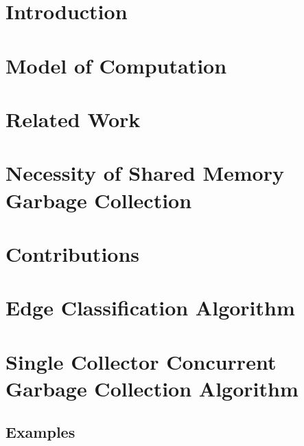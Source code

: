\section{Introduction}
\section{Model of Computation}
\section{Related Work}
\section{Necessity of Shared Memory Garbage Collection}
\section{Contributions}

\section{Edge Classification Algorithm}
\section{Single Collector Concurrent Garbage Collection Algorithm}
\subsection{Examples}
